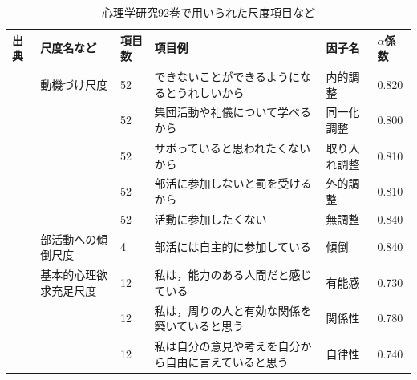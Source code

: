 \begin{landscape}
    \begin{longtable}{p{2cm}p{2cm}p{2cm}p{6cm}p{2cm}p{2cm}}
        \caption{心理学研究92巻で用いられた尺度項目など}
        \label{JPA92Scales}                                                                                                                                      \\
        \hline
        出典                       & 尺度名など                            & 項目数 & 項目例                                                 & 因子名                  & $\alpha$係数 \\ \hline
        \hline \endhead
        \citet{Suzuki202192}     & 動機づけ尺度                           & 52  & できないことができるようになるとうれしいから                              & 内的調整                 & 0.820   \\
                                 &                                  & 52  & 集団活動や礼儀について学べるから                                    & 同一化調整                & 0.800   \\
                                 &                                  & 52  & サボっていると思われたくないから                                    & 取り入れ調整               & 0.810   \\
                                 &                                  & 52  & 部活に参加しないと罰を受けるから                                    & 外的調整                 & 0.810   \\
                                 &                                  & 52  & 活動に参加したくない                                          & 無調整                  & 0.840   \\
                                 & 部活動への傾倒尺度                        & 4   & 部活には自主的に参加している                                      & 傾倒                   & 0.840   \\
                                 & 基本的心理欲求充足尺度                      & 12  & 私は，能力のある人間だと感じている                                   & 有能感                  & 0.730   \\
                                 &                                  & 12  & 私は，周りの人と有効な関係を築いていると思う                              & 関係性                  & 0.780   \\
                                 &                                  & 12  & 私は自分の意見や考えを自分から自由に言えていると思う                          & 自律性                  & 0.740   \\

\end{longtable}
\end{landscape}
